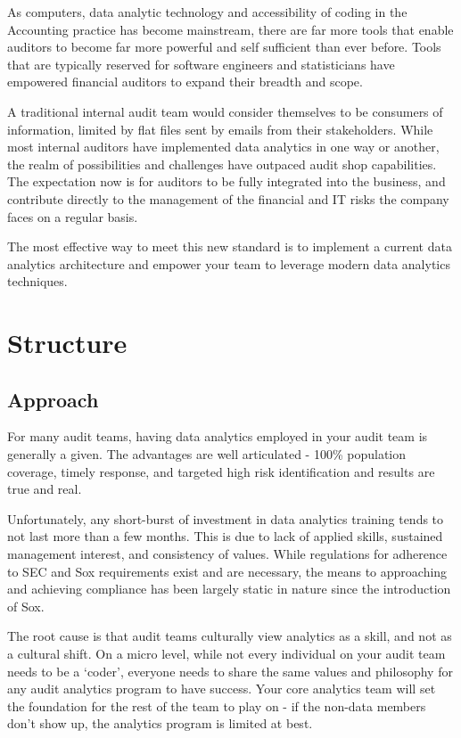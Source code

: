 \documentclass[
]{book}
\begin{document}
As computers, data analytic technology and accessibility of coding in the Accounting practice has become mainstream, there are far more tools that enable auditors to become far more powerful and self sufficient than ever before. Tools that are typically reserved for software engineers and statisticians have empowered financial auditors to expand their breadth and scope.

A traditional internal audit team would consider themselves to be consumers of information, limited by flat files sent by emails from their stakeholders. While most internal auditors have implemented data analytics in one way or another, the realm of possibilities and challenges have outpaced audit shop capabilities. The expectation now is for auditors to be fully integrated into the business, and contribute directly to the management of the financial and IT risks the company faces on a regular basis.

The most effective way to meet this new standard is to implement a current data analytics architecture and empower your team to leverage modern data analytics techniques.

\hypertarget{part-structure}{%
\part{Structure}\label{part-structure}}

\hypertarget{approach}{%
\chapter{Approach}\label{approach}}

For many audit teams, having data analytics employed in your audit team is generally a given. The advantages are well articulated - 100\% population coverage, timely response, and targeted high risk identification and results are true and real.

Unfortunately, any short-burst of investment in data analytics training tends to not last more than a few months. This is due to lack of applied skills, sustained management interest, and consistency of values. While regulations for adherence to SEC and Sox requirements exist and are necessary, the means to approaching and achieving compliance has been largely static in nature since the introduction of Sox.

The root cause is that audit teams culturally view analytics as a skill, and not as a cultural shift. On a micro level, while not every individual on your audit team needs to be a `coder', everyone needs to share the same values and philosophy for any audit analytics program to have success. Your core analytics team will set the foundation for the rest of the team to play on - if the non-data members don't show up, the analytics program is limited at best.
\end{document}
